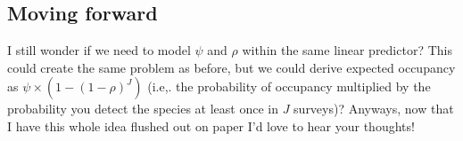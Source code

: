 \documentclass[
]{article}
\begin{document}
\hypertarget{moving-forward}{%
\subsection{Moving forward}\label{moving-forward}}

I still wonder if we need to model \(\psi\) and \(\rho\) within the same
linear predictor? This could create the same problem as before, but we
could derive expected occupancy as \(\psi \times (1 - (1-\rho)^J)\)
(i.e,. the probability of occupancy multiplied by the probability you
detect the species at least once in \(J\) surveys)? Anyways, now that I
have this whole idea flushed out on paper I'd love to hear your
thoughts!
\end{document}
